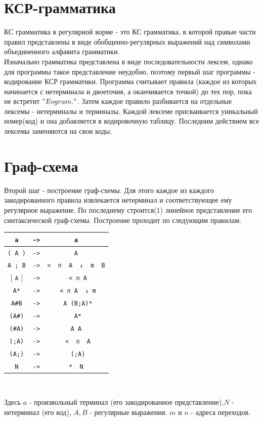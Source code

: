 \documentclass[12pt]{article}
\newcommand\tab[1][1cm]{\hspace*{#1}}
\begin{document}
\section{КСР-грамматика}
КС грамматика в регулярной ворме - это КС грамматика, в которой правые части правил представлены в виде обобщенно-регулярных выражений над символами объединенного алфавита грамматики.\\

Изначально грамматика представлена в виде последовательности лексем, однако для программы такое представление неудобно, поэтому первый шаг программы - кодирование КСР грамматики. Программа считывает правила (каждое из которых начинается с нетерминала и двоеточия, а оканчивается точкой) до тех пор, пока не встретит $"Eogram."$. Затем каждое правило разбивается на отдельные лексемы - нетерминалы и терминалы. Каждой лексеме присваивается уникальный номер(код) и она добавляется в кодировочную таблицу. Последним действием все лексемы заменяются на свои коды.
\section{Граф-схема}
Второй шаг - построение граф-схемы. Для этого каждое из каждого закодированного правила извлекается нетерминал и соответствующее ему регулярное выражение. По последнему строится(1) линейное представление его синтаксической граф-схемы. Построение проходит по следующим правилам:\\
\begin{center}
\begin{tabular}{|c|c|c|}
	\hline
	\texttt{a} & \texttt{->} & \texttt{a}\\\hline
	 \texttt{( A )} &\texttt{->}& \texttt{A}\\\hline
	 \texttt{A ; B}&\texttt{->} &\texttt{< \ n\  \ A \ ↓ \ m \ B}\\\hline
  $\texttt{[ A ]}$ & \texttt{->} &\texttt{ <\ n\ A}\\\hline
	\texttt{A*}&\texttt{->} &\texttt{ <\ n\ A \ ↓\ m}\\\hline
	 \texttt{A\#B} &\texttt{->}&\texttt{ A (B;A)*}\\\hline
	\texttt{(A\#)}&\texttt{->}&\texttt{ A*}\\\hline
	 \texttt{(\#A)}&\texttt{->}&\texttt{A A}\\\hline
	 \texttt{(;A)}&\texttt{->}&\texttt{ < \ n \ A}\\\hline
	\texttt{(A;)}&\texttt{->}&\texttt{ (;A)}\\\hline
	 \texttt{N} &\texttt{->}&\texttt{* \ N}\\\hline

\end{tabular}\\
\end{center}
	\tab Здесь $a$ - произвольный терминал (его закодированное представление),$N$ - нетерминал (его код), $A,B$ - регулярные выражения. $m$ и $n$ - адреса переходов.\\
	
\end{document}
